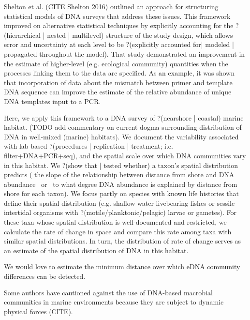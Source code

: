 \documentclass[11pt,letterpaper]{article} %
\begin{document}
Shelton et al. (CITE Shelton 2016) outlined an approach for structuring statistical models of DNA surveys that address these issues.
This framework improved on alternative statistical techniques by explicitly accounting for the ?(hierarchical | nested | multilevel) structure of the study design, which allows error and uncertainty at each level to be ?(explicitly accounted for| modeled | propagated throughout the model).
That study demonstrated an improvement in the estimate of higher-level (e.g. ecological community) quantities when the processes linking them to the data are specified.
As an example, it was shown that incorporation of data about the mismatch between primer and template DNA sequence can improve the estimate of the relative abundance of unique DNA templates input to a PCR.

Here, we apply this framework to a DNA survey of ?(nearshore | coastal) marine habitat.
(TODO add commentary on current dogma surrounding distribution of DNA in well-mixed (marine) habitats).
We document the variability associated with lab based ?(procedures | replication | treatment; i.e. filter+DNA+PCR+seq), and the spatial scale over which DNA communities vary in this habitat.
We ?(show that | tested whether) a taxon's spatial distribution predicts ( the slope of the relationship between distance from shore and DNA abundance ~or~ to what degree DNA abundance is explained by distance from shore for each taxon).
We focus partly on species with known life histories that define their spatial distribution (e.g. shallow water livebearing fishes or sessile intertidal organisms with ?(motile/planktonic/pelagic) larvae or gametes).
For these taxa whose spatial distribution is well-documented and restricted, we calculate the rate of change in space and compare this rate among taxa with similar spatial distributions.
In turn, the distribution of rate of change serves as an estimate of the spatial distribution of DNA in this habitat.

We would love to estimate the minimum distance over which eDNA community differences can be detected.

Some authors have cautioned against the use of DNA-based macrobial communities in marine environments because they are subject to dynamic physical forces (CITE).
\end{document}
